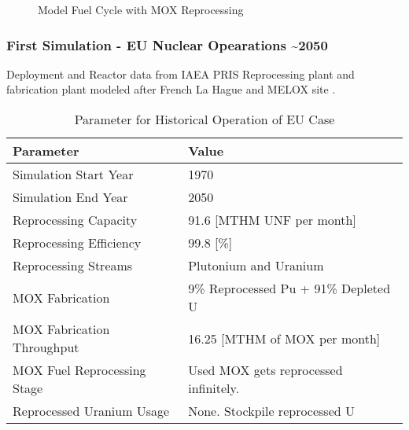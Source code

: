 \begin{frame}
\begin{figure}
\begin{adjustbox}{max totalsize={1.1\textwidth}{.8\textheight}, center}
                \end{adjustbox}
                
                \caption{Model Fuel Cycle with \gls{MOX} Reprocessing}
                \label{diag:fc}
\end{figure}
\end{frame}

\begin{frame}
	\frametitle{First Simulation - EU Nuclear Opearations \textasciitilde 2050}
	Deployment and Reactor data from IAEA PRIS
	Reprocessing plant and fabrication plant modeled after French La Hague and MELOX site
	\cite{schneider_spent_2008, hugelmann_melox_1999}.
		
\begin{table}[h]
	\centering
	\begin{tabularx}{\textwidth}{bb}
		\hline
		Parameter & Value \\
		\hline
		Simulation Start Year & 1970   \\
		Simulation End Year & 2050  \\ 
		Reprocessing Capacity & 91.6 [MTHM \gls{UNF} per month] \cite{schneider_spent_2008}  \\
		Reprocessing Efficiency & 99.8 [\%] \\
		Reprocessing Streams & Plutonium and Uranium  \\
		\gls{MOX} Fabrication & \small{9\% Reprocessed Pu + 91\% Depleted U} \\
		\gls{MOX} Fabrication Throughput & 16.25 [MTHM of \gls{MOX} per month]  \cite{hugelmann_melox_1999} \\
		\gls{MOX} Fuel Reprocessing Stage &  Used \gls{MOX} gets reprocessed infinitely. \\  
		Reprocessed Uranium Usage &  None. Stockpile reprocessed U \\
		\hline
	\end{tabularx}
	\caption {Parameter for Historical Operation of \gls{EU} Case}
	\label{tab:sim_eu}
\end{table}
	
\end{frame}


